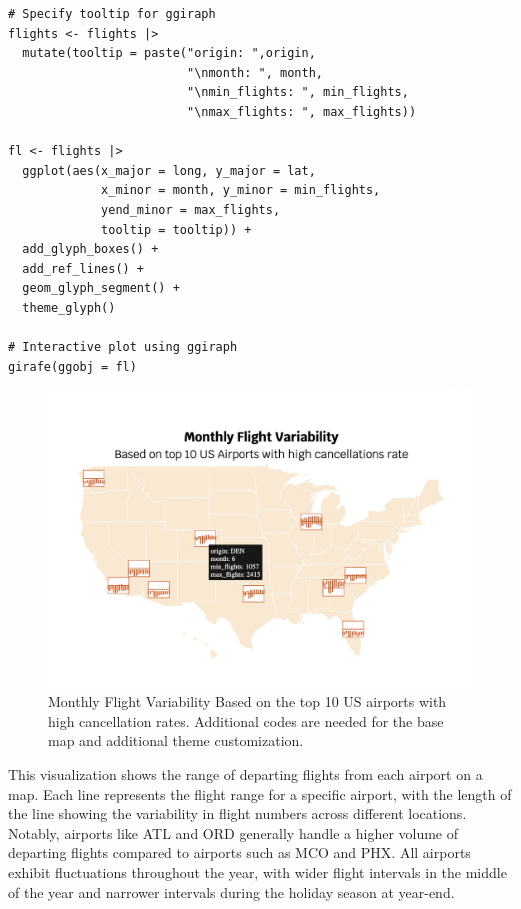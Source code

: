 \begin{verbatim}
# Specify tooltip for ggiraph 
flights <- flights |>
  mutate(tooltip = paste("origin: ",origin,
                         "\nmonth: ", month,
                         "\nmin_flights: ", min_flights,
                         "\nmax_flights: ", max_flights))

fl <- flights |> 
  ggplot(aes(x_major = long, y_major = lat,
             x_minor = month, y_minor = min_flights,
             yend_minor = max_flights,
             tooltip = tooltip)) + 
  add_glyph_boxes() +
  add_ref_lines() +
  geom_glyph_segment() +
  theme_glyph()

# Interactive plot using ggiraph
girafe(ggobj = fl)
\end{verbatim}

\begin{figure}
\includegraphics[width=15.14in]{figures/monthly-flight-variability} \caption{Monthly Flight Variability Based on the top 10 US airports with high cancellation rates. Additional codes are needed for the base map and additional theme customization.}\label{fig:unnamed-chunk-19}
\end{figure}

This visualization shows the range of departing flights from each airport on a map. Each line represents the flight range for a specific airport, with the length of the line showing the variability in flight numbers across different locations. Notably, airports like ATL and ORD generally handle a higher volume of departing flights compared to airports such as MCO and PHX. All airports exhibit fluctuations throughout the year, with wider flight intervals in the middle of the year and narrower intervals during the holiday season at year-end.

